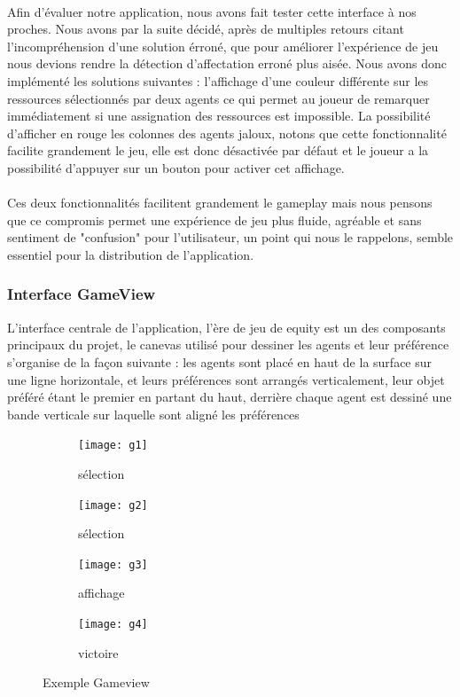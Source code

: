 \documentclass[../main.tex]{subfiles}
\begin{document}
\paragraph{}
    Afin d'évaluer notre application, nous avons fait tester cette interface à nos proches. Nous avons par la suite décidé, après de multiples retours citant l'incompréhension d'une solution érroné,  que pour améliorer l'expérience de jeu nous devions rendre la détection d’affectation erroné plus aisée. Nous avons donc implémenté les solutions suivantes :
 l’affichage d’une couleur différente sur les ressources sélectionnés par deux agents ce qui permet au joueur de remarquer immédiatement si une assignation des ressources est impossible.
La possibilité d’afficher en rouge les colonnes des agents jaloux, notons que cette fonctionnalité facilite grandement le jeu, elle est donc désactivée par défaut et le joueur a la possibilité d’appuyer sur un bouton pour activer cet affichage.
\paragraph{}
    Ces deux fonctionnalités facilitent grandement le gameplay mais nous pensons que ce compromis permet une expérience de jeu plus fluide, agréable et sans sentiment de "confusion"  pour l’utilisateur, un point qui nous le rappelons, semble essentiel pour la distribution de l’application. 


	\subsubsection{Interface GameView}
	
L'interface centrale de  l'application, l'ère de jeu de equity est un des composants principaux du projet, le canevas utilisé pour dessiner les agents et leur préférence s'organise de la façon suivante : les agents sont placé en haut de la surface sur une ligne horizontale, et leurs préférences sont arrangés verticalement, leur objet préféré étant le premier en partant du haut, derrière chaque agent est dessiné une bande verticale sur laquelle sont aligné les préférences 
\begin{figure}[h!]
    \centering
    \begin{subfigure}{0.23\textwidth}
        \centering
        \texttt{[image: g1]}
        \caption{sélection}
    \end{subfigure}
        \begin{subfigure}{0.23\textwidth}
        \centering
        \texttt{[image: g2]}
        \caption{sélection}
    \end{subfigure}%
        \begin{subfigure}{0.23\textwidth}
        \centering
        \texttt{[image: g3]}
        \caption{affichage}
    \end{subfigure}%
    \begin{subfigure}{0.23\textwidth}
        \centering
        \texttt{[image: g4]}
        \caption{victoire}
    \end{subfigure}
    \caption{Exemple Gameview}
\end{figure}
\end{document}
